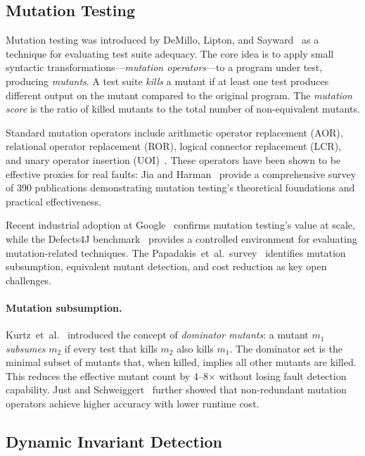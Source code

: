 \documentclass[11pt]{article}
\begin{document}
\subsection{Mutation Testing}
\label{sec:mutation-testing}

Mutation testing was introduced by DeMillo, Lipton, and
Sayward~\cite{demillo1978} as a technique for evaluating test suite adequacy.
The core idea is to apply small syntactic transformations---\emph{mutation
operators}---to a program under test, producing \emph{mutants}. A test suite
\emph{kills} a mutant if at least one test produces different output on the
mutant compared to the original program. The \emph{mutation score} is the ratio
of killed mutants to the total number of non-equivalent mutants.

Standard mutation operators include arithmetic operator replacement (AOR),
relational operator replacement (ROR), logical connector replacement (LCR), and
unary operator insertion (UOI)~\cite{offutt2001}. These operators have been
shown to be effective proxies for real faults: Jia and
Harman~\cite{jia2011} provide a comprehensive survey of 390 publications
demonstrating mutation testing's theoretical foundations and practical
effectiveness.

Recent industrial adoption at Google~\cite{petrovic2018} confirms mutation
testing's value at scale, while the Defects4J benchmark~\cite{just2014} provides
a controlled environment for evaluating mutation-related techniques. The
Papadakis~et~al.\ survey~\cite{papadakis2019} identifies mutation subsumption,
equivalent mutant detection, and cost reduction as key open challenges.

\paragraph{Mutation subsumption.} Kurtz~et~al.~\cite{kurtz2016} introduced the
concept of \emph{dominator mutants}: a mutant $m_1$ \emph{subsumes} $m_2$ if
every test that kills $m_2$ also kills $m_1$. The dominator set is the minimal
subset of mutants that, when killed, implies all other mutants are killed. This
reduces the effective mutant count by 4--8$\times$ without losing fault detection
capability. Just and Schweiggert~\cite{just2015} further showed that
non-redundant mutation operators achieve higher accuracy with lower runtime cost.

\subsection{Dynamic Invariant Detection}
\label{sec:daikon}
\end{document}
